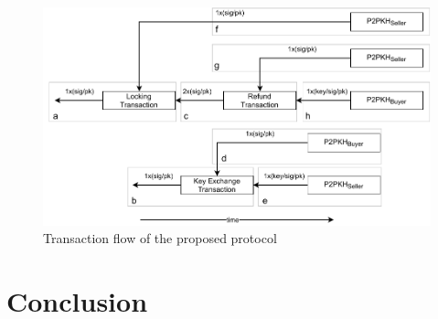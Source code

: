 \documentclass{cacthesis}
\newcounter{protocol}
\begin{document}
	    
	    
	    
	    \begin{figure}
            \begin{center}
                \includegraphics[width=\textwidth]{images/transaction_flow.pdf}
              \caption{Transaction flow of the proposed protocol}
              \label{fig:transactionFlow}
            \end{center}
        \end{figure}
	    
	\chapter{Conclusion}
	\label{sec:Conclusion}
	
\end{document}
